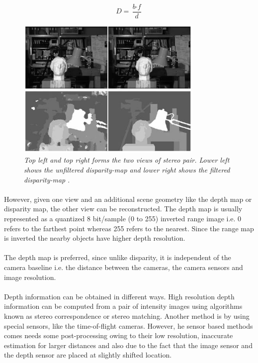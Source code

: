 \begin{equation}
D = \frac{\textit{b} \cdot \textit{f}}{\textit{d}}
\end{equation}

\begin{figure}[ht]
\centerline{\includegraphics[width=0.8\textwidth]{stereo_disparity_depth.png}}
\caption{\textit{Top left and top right forms the two views of stereo pair. Lower left shows the unfiltered disparity-map and lower right shows the filtered disparity-map \cite{bib:img_stereo_disparity_depth}} \label{fig:depth_disparity}.}
\end{figure}


\paragraph{} 
However, given one view and an additional scene geometry like the depth map or disparity map, the other view can be reconstructed. The depth map is usually represented as a quantized 8 bit/sample (0 to 255) inverted range image i.e. 0 refers to the farthest point whereas 255 refers to the nearest. Since the range map is inverted the nearby objects have higher depth resolution.

\paragraph{}
The depth map is preferred, since unlike disparity, it is independent of the camera baseline i.e. the distance between the cameras, the camera sensors and image resolution.


\paragraph{}
Depth information can be obtained in different ways. High resolution depth information can be computed from a pair of intensity images using algorithms known as stereo correspondence or stereo matching. Another method is by using special sensors, like the time-of-flight cameras. However, he sensor based methods comes needs some post-processing owing to their low resolution, inaccurate estimation for larger distances and also due to the fact that the image sensor and the depth sensor are placed at slightly shifted location.  
	
